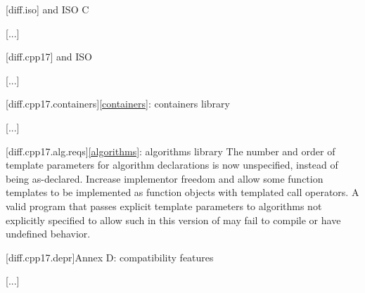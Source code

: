 \setcounter{chapter}{2}

[diff.iso]{\Cpp{} and ISO C}

[...]

\setcounter{section}{4}
[diff.cpp17]{\Cpp{} and ISO \CppXVII{}}

[...]

\setcounter{subsection}{7}
[diff.cpp17.containers]{\ref{containers}: containers library}

[...]

\begin{addedblock}
[diff.cpp17.alg.reqs]{\ref{algorithms}: algorithms library}
\change
The number and order of template parameters for algorithm declarations
is now unspecified, instead of being as-declared.
\rationale Increase implementor freedom and allow some function templates
to be implemented as function objects with templated call operators.
\effect
A valid \CppXVII{} program that passes explicit template parameters to
algorithms not explicitly specified to allow such in this version of \Cpp{}
may fail to compile or have undefined behavior.
\end{addedblock}

[diff.cpp17.depr]{Annex D: compatibility features}

[...]
